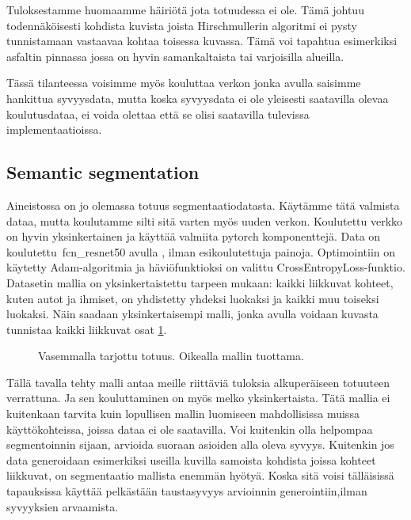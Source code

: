 Tuloksestamme huomaamme häiriötä jota totuudessa ei ole.
Tämä johtuu todennäköisesti kohdista kuvista joista Hirschmullerin algoritmi ei pysty tunnistamaan vastaavaa kohtaa toisessa kuvassa.
Tämä voi tapahtua esimerkiksi asfaltin pinnassa jossa on hyvin samankaltaista tai varjoisilla alueilla. 

Tässä tilanteessa voisimme myös kouluttaa verkon jonka avulla saisimme hankittua syvyysdata,
mutta koska syvyysdata ei ole yleisesti saatavilla olevaa koulutusdataa,
ei voida olettaa että se olisi saatavilla tulevissa implementaatioissa. 

\subsection{Semantic segmentation}

Aineistossa on jo olemassa totuus segmentaatiodatasta.
Käytämme tätä valmista dataa, mutta koulutamme silti sitä varten myös uuden verkon.
Koulutettu verkko on hyvin yksinkertainen ja käyttää valmiita pytorch komponenttejä.
Data on koulutettu\ fcn\_resnet50 avulla \cite{pytorchfcnresnet50}, ilman esikoulutettuja painoja. Optimointiin on käytetty Adam-algoritmia ja häviöfunktioksi on valittu CrossEntropyLoss-funktio.
Datasetin mallia on yksinkertaistettu tarpeen mukaan: kaikki liikkuvat kohteet, kuten autot ja ihmiset, on yhdistetty yhdeksi luokaksi ja kaikki muu toiseksi luokaksi.
Näin saadaan yksinkertaisempi malli, jonka avulla voidaan kuvasta tunnistaa kaikki liikkuvat osat \ref{fig:segmentation1}.

\begin{figure}[h]
\centering
{}
\caption[Tämä on lyhyt kuvateksti.]{Vasemmalla tarjottu totuus. Oikealla mallin tuottama.}
\label{fig:segmentation1}
\end{figure}
    

Tällä tavalla tehty malli antaa meille riittäviä tuloksia alkuperäiseen totuuteen verrattuna.
Ja sen kouluttaminen on myös melko yksinkertaista.
Tätä mallia ei kuitenkaan tarvita kuin lopullisen mallin luomiseen mahdollisissa muissa käyttökohteissa, joissa dataa ei ole saatavilla.
Voi kuitenkin olla helpompaa segmentoinnin sijaan, arvioida suoraan asioiden alla oleva syvyys.
Kuitenkin jos data generoidaan esimerkiksi useilla kuvilla samoista kohdista joissa kohteet liikkuvat,
on segmentaatio mallista enemmän hyötyä.
Koska sitä voisi tälläisissä tapauksissa käyttää pelkästään taustasyvyys arvioinnin generointiin,ilman syvyyksien arvaamista.

